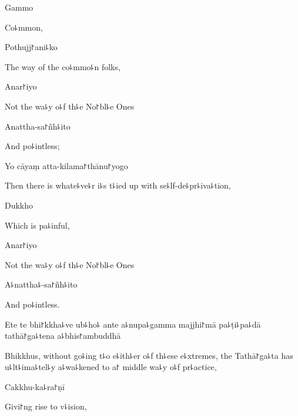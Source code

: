 Gammo

\begin{english}
  Co꜕mmon,
\end{english}

Pothujj꜓ani꜕ko

\begin{english}
  The way of the co꜕mmo꜕n folks,
\end{english}

Anar꜓iyo

\begin{english}
  Not the wa꜕y o꜕f th꜕e No꜓bl꜕e Ones
\end{english}

\clearpage

Anattha-sa꜓ñh꜕ito

\begin{english}
  And po꜕intless;
\end{english}

Yo cāyaṃ atta-kilama꜓thānu꜓yogo

\begin{english}
  Then there is whate꜕ve꜕r i꜕s t꜕ied up with se꜕lf-de꜕pr꜕iva꜕tion,
\end{english}

Dukkho

\begin{english}
  Which is pa꜕inful,
\end{english}

Anar꜓iyo

\begin{english}
  Not the wa꜕y o꜕f th꜕e No꜓bl꜕e Ones
\end{english}

A꜕nattha꜕-sa꜓ñh꜕ito

\begin{english}
  And po꜕intless.
\end{english}

Ete te bhi꜓kkha꜕ve ub꜕ho꜕ ante a꜕nupa꜕gamma majjhi꜓mā pa꜕ṭi꜕pa꜕dā tathā꜓ga꜕tena a꜕bhis꜓ambuddhā

\begin{english}
  Bhikkhus, without go꜕ing t꜕o e꜕ith꜕er o꜕f th꜕ese e꜕xtremes, the
  Tathā꜓ga꜕ta has u꜕lt꜕ima꜕tel꜕y a꜕wa꜕kened to a꜓ middle wa꜕y o꜕f
  pr꜕actice,
\end{english}

Cakkhu-ka꜕ra꜓ṇī

\begin{english}
  Givi꜓ng rise to v꜕ision,
\end{english}


